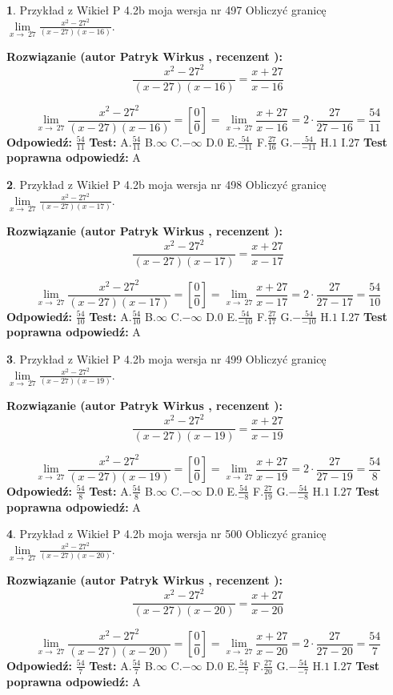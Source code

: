 \documentclass[12pt, a4paper]{article}
\theoremstyle{definition} %
\newtheorem{zad}{}
\newcommand{\zadStart}[1]{\begin{zad}#1\newline}
\newcommand{\zadStop}{\end{zad}}
\newcommand{\rozwStart}[2]{\noindent \textbf{Rozwiązanie (autor #1 , recenzent #2): }\newline}
\newcommand{\rozwStop}{\newline}
\newcommand{\odpStart}{\noindent \textbf{Odpowiedź:}\newline}
\newcommand{\odpStop}{\newline}
\newcommand{\testStart}{\noindent \textbf{Test:}\newline}
\newcommand{\testStop}{\newline}
\newcommand{\kluczStart}{\noindent \textbf{Test poprawna odpowiedź:}\newline}
\newcommand{\kluczStop}{\newline}
\begin{document}
\zadStart{Przykład z Wikieł P 4.2b moja wersja nr 497}
Obliczyć granicę $\lim\limits_{x\to\ 27}\frac{x^{2}-27^{2}}{(x-27)(x-16)}$.
\zadStop
\rozwStart{Patryk Wirkus}{}
$$\frac{x^{2}-27^{2}}{(x-27)(x-16)}=\frac{x+27}{x-16}$$

$$\lim\limits_{x\to\ 27}\frac{x^{2}-27^{2}}{(x-27)(x-16)}=[\frac{0}{0}]=\lim\limits_{x\to\ 27}\frac{x+27}{x-16}=2 \cdot \frac{27}{27-16} = \frac{54}{11}$$
\rozwStop
\odpStart
$\frac{54}{11}$
\odpStop
\testStart
A.$\frac{54}{11}$
B.$\infty$
C.$-\infty$
D.$0$
E.$\frac{54}{-11}$
F.$\frac{27}{16}$
G.$-\frac{54}{-11}$
H.$1$
I.$27$
\testStop
\kluczStart
A
\kluczStop



\zadStart{Przykład z Wikieł P 4.2b moja wersja nr 498}
Obliczyć granicę $\lim\limits_{x\to\ 27}\frac{x^{2}-27^{2}}{(x-27)(x-17)}$.
\zadStop
\rozwStart{Patryk Wirkus}{}
$$\frac{x^{2}-27^{2}}{(x-27)(x-17)}=\frac{x+27}{x-17}$$

$$\lim\limits_{x\to\ 27}\frac{x^{2}-27^{2}}{(x-27)(x-17)}=[\frac{0}{0}]=\lim\limits_{x\to\ 27}\frac{x+27}{x-17}=2 \cdot \frac{27}{27-17} = \frac{54}{10}$$
\rozwStop
\odpStart
$\frac{54}{10}$
\odpStop
\testStart
A.$\frac{54}{10}$
B.$\infty$
C.$-\infty$
D.$0$
E.$\frac{54}{-10}$
F.$\frac{27}{17}$
G.$-\frac{54}{-10}$
H.$1$
I.$27$
\testStop
\kluczStart
A
\kluczStop



\zadStart{Przykład z Wikieł P 4.2b moja wersja nr 499}
Obliczyć granicę $\lim\limits_{x\to\ 27}\frac{x^{2}-27^{2}}{(x-27)(x-19)}$.
\zadStop
\rozwStart{Patryk Wirkus}{}
$$\frac{x^{2}-27^{2}}{(x-27)(x-19)}=\frac{x+27}{x-19}$$

$$\lim\limits_{x\to\ 27}\frac{x^{2}-27^{2}}{(x-27)(x-19)}=[\frac{0}{0}]=\lim\limits_{x\to\ 27}\frac{x+27}{x-19}=2 \cdot \frac{27}{27-19} = \frac{54}{8}$$
\rozwStop
\odpStart
$\frac{54}{8}$
\odpStop
\testStart
A.$\frac{54}{8}$
B.$\infty$
C.$-\infty$
D.$0$
E.$\frac{54}{-8}$
F.$\frac{27}{19}$
G.$-\frac{54}{-8}$
H.$1$
I.$27$
\testStop
\kluczStart
A
\kluczStop



\zadStart{Przykład z Wikieł P 4.2b moja wersja nr 500}
Obliczyć granicę $\lim\limits_{x\to\ 27}\frac{x^{2}-27^{2}}{(x-27)(x-20)}$.
\zadStop
\rozwStart{Patryk Wirkus}{}
$$\frac{x^{2}-27^{2}}{(x-27)(x-20)}=\frac{x+27}{x-20}$$

$$\lim\limits_{x\to\ 27}\frac{x^{2}-27^{2}}{(x-27)(x-20)}=[\frac{0}{0}]=\lim\limits_{x\to\ 27}\frac{x+27}{x-20}=2 \cdot \frac{27}{27-20} = \frac{54}{7}$$
\rozwStop
\odpStart
$\frac{54}{7}$
\odpStop
\testStart
A.$\frac{54}{7}$
B.$\infty$
C.$-\infty$
D.$0$
E.$\frac{54}{-7}$
F.$\frac{27}{20}$
G.$-\frac{54}{-7}$
H.$1$
I.$27$
\testStop
\kluczStart
A
\kluczStop
\end{document}
